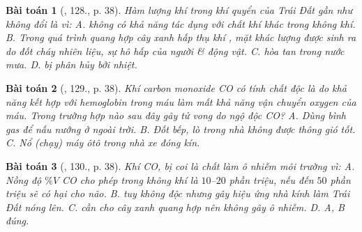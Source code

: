 \documentclass{article}
\newtheorem{baitoan}{Bài toán}
\begin{document}
\begin{baitoan}[\cite{An_400_BT_Hoa_Hoc_9}, 128., p. 38]
	Hàm lượng khí {\rm{}} trong khí quyển của Trái Đất gần như không đổi là vì: {\sf A.} {\rm{}} không có khả năng tác dụng với chất khí khác trong không khí. {\sf B.} Trong quá trình quang hợp cây xanh hấp thụ khí {\rm{}}, mặt khác lượng {\rm{}} được sinh ra do đốt cháy nhiên liệu, sự hô hấp của người \& động vật. {\sf C.} {\rm{}} hòa tan trong nước mưa. {\sf D.} {\rm{}} bị phân hủy bởi nhiệt.
\end{baitoan}

\begin{baitoan}[\cite{An_400_BT_Hoa_Hoc_9}, 129., p. 38]
	Khí carbon monoxide {\rm CO} có tính chất độc là do khả năng kết hợp với hemoglobin trong máu làm mất khả năng vận chuyển oxygen của máu. Trong trường hợp nào sau đây gây tử vong do ngộ độc {\rm CO}? {\sf A.} Dùng bình gas để nấu nướng ở ngoài trời. {\sf B.} Đốt bếp, lò trong nhà không được thông gió tốt. {\sf C.} Nổ (chạy) máy ôtô trong nhà xe đóng kín.
\end{baitoan}

\begin{baitoan}[\cite{An_400_BT_Hoa_Hoc_9}, 130., p. 38]
	Khí {\rm CO, } bị coi là chất làm ô nhiễm môi trường vì: {\sf A.} Nồng độ $\%V$ {\rm CO} cho phép trong không khí là $10$--$20$ phần triệu, nếu đến $50$ phần triệu sẽ có hại cho não. {\sf B.} {\rm{}} tuy không độc nhưng gây hiệu ứng nhà kính làm Trái Đất nóng lên. {\sf C.} {\rm{}}  cần cho cây xanh quang hợp nên không gây ô nhiễm. {\sf D. A, B} đúng.
\end{baitoan}


\printbibliography[heading=bibintoc]
\end{document}
